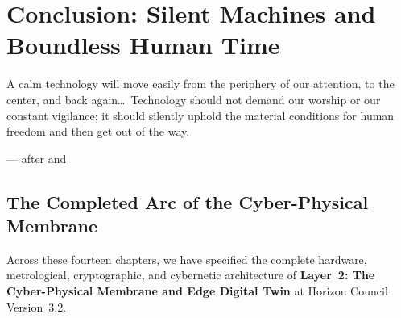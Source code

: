 \chapter{Conclusion: Silent Machines and Boundless Human Time}
\label{ch:conclusion-silent-machines}

\epigraph{A calm technology will move easily from the periphery of our attention, to the center, and back again\dots\ Technology should not demand our worship or our constant vigilance; it should silently uphold the material conditions for human freedom and then get out of the way.}{--- after \textcite{weiser1996calm} and \textcite{illich1973}}

\section{The Completed Arc of the Cyber-Physical Membrane}
\label{sec:l2-conclusion-arc}

Across these fourteen chapters, we have specified the complete hardware, metrological, cryptographic, and cybernetic architecture of \textbf{Layer~2: The Cyber-Physical Membrane and Edge Digital Twin} at Horizon Council Version~3.2.

